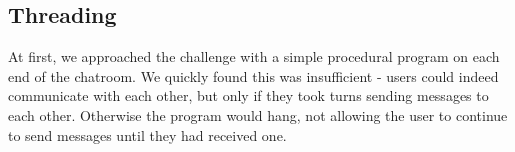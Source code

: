 \documentclass{article}
\begin{document}






\subsection{Threading}

At first, we approached the challenge with a simple procedural program on each end of the chatroom. We quickly found this was insufficient - users could indeed communicate with each other, but only if they took turns sending messages to each other. Otherwise the program would hang, not allowing the user to continue to send messages until they had received one.
\end{document}
